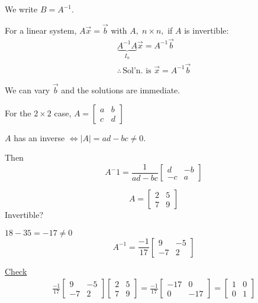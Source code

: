 \documentclass[../main.tex]{subfiles}
\begin{document}
We write \( B = A^{-1} \).

For a linear system, \( A \vec{x} = \vec{b} \) with \( A, \; n \times n, \) if \( A \) is invertible:
\begin{gather*}
    \underbrace{A^{-1}A}_{I_n} \vec{x} = A^{-1} \vec{b} \\
    \therefore \, \text{Sol'n. is } \vec{x} = A^{-1} \vec{b}
\end{gather*}

We can vary \( \vec{b} \) and the solutions are immediate.

For the \( 2 \times 2 \) case,
\( A = \begin{bmatrix}
    a & b \\
    c & d
\end{bmatrix} \)

\( A \) has an inverse \( \iff |A| = ad - bc \neq 0 \).

Then \[ A^-1 = \frac{1}{ad-bc}
    \begin{bmatrix}
        d & -b \\
        -c & a
    \end{bmatrix} 
\]

\begin{example}[]
    \[ A = \begin{bmatrix}
        2 & 5 \\
        7 & 9
    \end{bmatrix} \]
    Invertible?

    \( 18 - 35 = -17 \neq 0 \) \checkmark
    \[ A^{-1} = \frac{-1}{17} \begin{bmatrix}
        9 & -5 \\
        -7 & 2
    \end{bmatrix} \]

    \underline{Check}
    \begin{gather*}
        \frac{-1}{17}
        \begin{bmatrix}
            9 & -5 \\
            -7 & 2
        \end{bmatrix}
        \begin{bmatrix}
            2 & 5 \\
            7 & 9
        \end{bmatrix}
        = \frac{-1}{17}
        \begin{bmatrix}
            -17 & 0 \\
            0 & -17
        \end{bmatrix}
        = \begin{bmatrix}
            1 & 0 \\
            0 & 1
        \end{bmatrix}
    \end{gather*}
\end{example}
\end{document}
